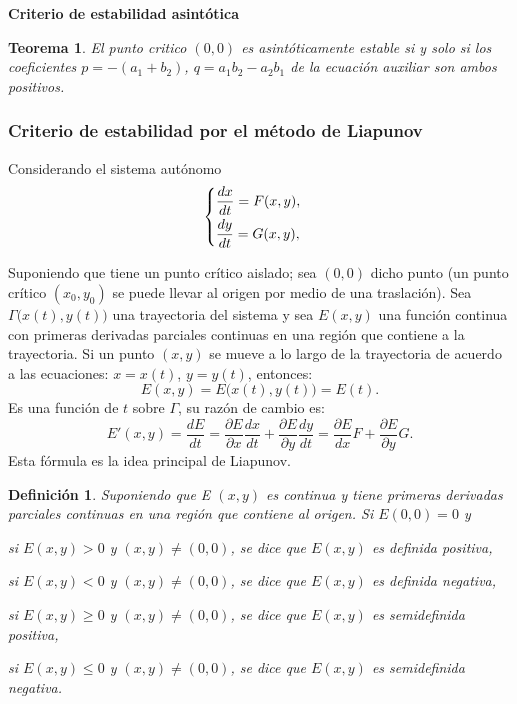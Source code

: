 \documentclass[a5paper,doc,10pt,noapacite]{apa6}
\newtheorem{definicion}{Definición}
\newtheorem{teorema}{Teorema}
\newcommand{\neodefi}[1]{%
	\vspace{1\baselineskip}
	\textbf{\small#1} \newline
}
\begin{document}
{{%
\neodefi{Criterio de estabilidad asintótica}

\begin{teorema}
	El punto critico \((0,0)\) es asintóticamente estable si y solo si  los coeficientes \(p=-(a_1+b_2)\), \(q=a_1b_2-a_2b_1\) de la ecuación auxiliar son ambos positivos.
\end{teorema}


%
%
%
\subsubsection{Criterio de estabilidad por el método de Liapunov}
%
%
%
Considerando el sistema autónomo
\begin{equation}\label{m-9}
	\begin{cases}
		\dfrac{dx}{dt}=F(x,y) ,\vspace{0.3em}
		\\
		\dfrac{dy}{dt}=G(x,y),
	\end{cases}
\end{equation}

Suponiendo que tiene un punto crítico aislado; sea \((0,0)\) dicho punto (un punto crítico \(( x_0 , y_0 )\) se puede
llevar al origen por medio de una traslación). Sea \(\Gamma\big(x(t),y(t)\big)\) una trayectoria del sistema y sea \(E( x , y )\) una función continua con primeras derivadas parciales continuas en una región que contiene a la trayectoria. Si un punto \(( x, y )\) se mueve a lo largo de la trayectoria de acuerdo a las ecuaciones: \(x = x ( t )\), \(y = y ( t )\), entonces: 
\[
	E(x,y)=E\big(x(t),y(t)\big)=E(t).
\]
Es una función de \(t\) sobre \(\Gamma\), su razón de cambio es:
\begin{equation}\label{m-10}
	E'(x,y)=\dfrac{dE}{dt}=\dfrac{\partial E}{\partial x}\dfrac{dx}{dt}+\dfrac{\partial E}{\partial y}\dfrac{dy}{dt}=\dfrac{\partial E}{dx}F+\dfrac{\partial E}{\partial y}G.
\end{equation}
Esta fórmula es la idea principal de Liapunov.

\begin{definicion}
	Suponiendo que E \(( x , y )\) es continua y tiene primeras derivadas parciales continuas en una región que contiene al origen. Si \(E ( 0 , 0 ) = 0\) y
	\begin{APAenumerate}
		\item si \(E(x,y)>0\) y \((x,y)\neq(0,0)\), se dice que \(E(x,y)\) es definida positiva,
		\item si \(E(x,y)<0\) y \((x,y)\neq(0,0)\), se dice que \(E(x,y)\) es definida negativa,
		\item si \(E(x,y)\geq 0\) y \((x,y)\neq(0,0)\), se dice que \(E(x,y)\) es semidefinida positiva,
		\item si \(E(x,y)\leq 0\) y \((x,y)\neq(0,0)\), se dice que \(E(x,y)\) es semidefinida negativa.
	\end{APAenumerate}
\end{definicion}

}}
\end{document}
